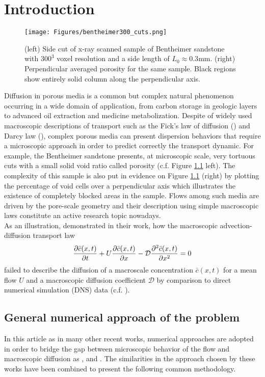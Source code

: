 \chapter{Introduction}
\begin{figure}
	\centering
	\texttt{[image: Figures/bentheimer300\_cuts.png]}
	\caption{(left) Side cut of x-ray scanned sample of Bentheimer sandstone with $300^3$ voxel resolution and a side length of $L_0\approx0.3$mm. (right) Perpendicular averaged porosity for the same sample. Black regions show entirely solid column along the perpendicular axis.}
	\label{fig:bentheimer300cuts}
\end{figure}
Diffusion in porous media is a common but complex natural phenomenon occurring in a wide domain of application, from carbon storage in geologic layers to advanced oil extraction and medicine metabolization.
Despite of widely used macroscopic descriptions of transport such as the Fick's law of diffusion (\citet{Fick1855}) and Darcy law (\citet{Darcy1856}), complex porous media can present dispersion behaviors that require a microscopic approach in order to predict correctly the transport dynamic.
For example, the Bentheimer sandstone presents, at microscopic scale, very tortuous cuts with a small solid void ratio called porosity (c.f. Figure \ref{fig:bentheimer300cuts} left).
The complexity of this sample is also put in evidence on Figure \ref{fig:bentheimer300cuts} (right) by plotting the percentage of void cells over a perpendicular axis which illustrates the existence of completely blocked areas in the sample.
Flows among such media are driven by the pore-scale geometry and their description using simple macroscopic laws constitute an active research topic nowadays.\\
As an illustration, \citet{Dentz2017} demonstrated in their work, how the macroscopic advection-diffusion transport law
\begin{equation}
	\pdv{\bar{c}(x,t)}{t}+U\pdv{\bar{c}(x,t)}{x}-\mathcal{D}\pdv[2]{\bar{c}(x,t)}{x}=0
\label{eq:adv_diff}
\end{equation}
failed to describe the diffusion of a macroscale concentration $\bar{c}(x,t)$ for a mean flow $U$ and a macroscopic diffusion coefficient $\mathcal{D}$ by comparison to direct numerical simulation (DNS) data (c.f. \citet[Fig. 3]{Dentz2017}).\\


\section{General numerical approach of the problem}
In this article as in many other recent works, numerical approaches are adopted in order to bridge the gap between microscopic behavior of the flow and macroscopic diffusion as \citet{Meyer2016}, \citet{Dentz2017} and \citet{Puyguiraud2019}. The similarities in the approach chosen by these works have been combined to present the following common methodology.
